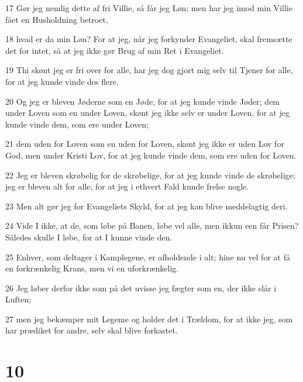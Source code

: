 \par 17 Gør jeg nemlig dette af fri Villie, så får jeg Løn; men har jeg imod min Villie fået en Husholdning betroet,
\par 18 hvad er da min Løn? For at jeg, når jeg forkynder Evangeliet, skal fremsætte det for intet, så at jeg ikke gør Brug af min Ret i Evangeliet.
\par 19 Thi skønt jeg er fri over for alle, har jeg dog gjort mig selv til Tjener for alle, for at jeg kunde vinde des flere.
\par 20 Og jeg er bleven Jøderne som en Jøde, for at jeg kunde vinde Jøder; dem under Loven som en under Loven, skønt jeg ikke selv er under Loven, for at jeg kunde vinde dem, som ere under Loven;
\par 21 dem uden for Loven som en uden for Loven, skønt jeg ikke er uden Lov for God, men under Kristi Lov, for at jeg kunde vinde dem, som ere uden for Loven.
\par 22 Jeg er bleven skrøbelig for de skrøbelige, for at jeg kunde vinde de skrøbelige; jeg er bleven alt for alle, for at jeg i ethvert Fald kunde frelse nogle.
\par 23 Men alt gør jeg for Evangeliets Skyld, for at jeg kan blive meddelagtig deri.
\par 24 Vide I ikke, at de, som løbe på Banen, løbe vel alle, men ikkun een får Prisen? Således skulle I løbe, for at I kunne vinde den.
\par 25 Enhver, som deltager i Kamplegene, er afholdende i alt; hine nu vel for at få en forkrænkelig Krans, men vi en uforkrænkelig.
\par 26 Jeg løber derfor ikke som på det uvisse jeg fægter som en, der ikke slår i Luften;
\par 27 men jeg bekæmper mit Legeme og holder det i Trældom, for at ikke jeg, som har prædiket for andre, selv skal blive forkastet.

\chapter{10}

